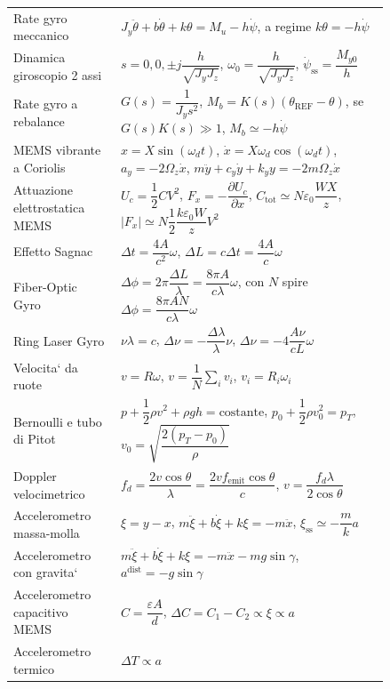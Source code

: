 \documentclass[11pt,a4paper]{article}
\begin{document}
{\begin{longtable}{>{\raggedright\arraybackslash}p{0.24\linewidth}>{\raggedright\arraybackslash}p{0.60\linewidth}}
Rate gyro meccanico & $J_y\ddot\theta+b\dot\theta+k\theta=M_u-h\dot\psi$, \quad a regime $k\theta=-h\dot\psi$ \\
Dinamica giroscopio 2 assi & $s=0,0,\pm j\dfrac{h}{\sqrt{J_yJ_z}}$, \quad $\omega_0=\dfrac{h}{\sqrt{J_yJ_z}}$, \quad $\dot\psi_{\text{ss}}=\dfrac{M_{y0}}{h}$ \\
Rate gyro a rebalance & $G(s)=\dfrac{1}{J_y s^2}$, \quad $M_b=K(s)(\theta_{\text{REF}}-\theta)$, \quad se $G(s)K(s)\gg 1$, $M_b\simeq -h\dot\psi$ \\
MEMS vibrante a Coriolis & $x=X\sin(\omega_d t)$, \quad $\dot x=X\omega_d\cos(\omega_d t)$, \quad $a_y=-2\Omega_z\dot x$, \quad $m\ddot y+c_y\dot y+k_y y=-2m\Omega_z\dot x$ \\
Attuazione elettrostatica MEMS & $U_c=\dfrac{1}{2}CV^2$, \quad $F_x=-\dfrac{\partial U_c}{\partial x}$, \quad $C_{\text{tot}}\simeq N\varepsilon_0\dfrac{WX}{z}$, \quad $|F_x|\simeq N\dfrac{1}{2}\dfrac{k\varepsilon_0W}{z}V^2$ \\
Effetto Sagnac & $\Delta t=\dfrac{4A}{c^2}\omega$, \quad $\Delta L=c\Delta t=\dfrac{4A}{c}\omega$ \\
Fiber-Optic Gyro & $\Delta\phi=2\pi\dfrac{\Delta L}{\lambda}=\dfrac{8\pi A}{c\lambda}\omega$, \quad con $N$ spire $\Delta\phi=\dfrac{8\pi A N}{c\lambda}\omega$ \\
Ring Laser Gyro & $\nu\lambda=c$, \quad $\Delta\nu=-\dfrac{\Delta\lambda}{\lambda}\nu$, \quad $\Delta\nu=-4\dfrac{A\nu}{cL}\omega$ \\
Velocita` da ruote & $v=R\omega$, \quad $v=\dfrac{1}{N}\sum_i v_i$, \quad $v_i=R_i\omega_i$ \\
Bernoulli e tubo di Pitot & $p+\dfrac{1}{2}\rho v^2+\rho gh=\text{costante}$, \quad $p_0+\dfrac{1}{2}\rho v_0^2=p_T$, \quad $v_0=\sqrt{\dfrac{2(p_T-p_0)}{\rho}}$ \\
Doppler velocimetrico & $f_d=\dfrac{2v\cos\theta}{\lambda}=\dfrac{2vf_{\text{emit}}\cos\theta}{c}$, \quad $v=\dfrac{f_d\lambda}{2\cos\theta}$ \\
Accelerometro massa-molla & $\xi=y-x$, \quad $m\ddot\xi+b\dot\xi+k\xi=-m\ddot x$, \quad $\xi_{\text{ss}}\simeq -\dfrac{m}{k}a$ \\
Accelerometro con gravita` & $m\ddot\xi+b\dot\xi+k\xi=-m\ddot x-mg\sin\gamma$, \quad $a^{\text{dist}}=-g\sin\gamma$ \\
Accelerometro capacitivo MEMS & $C=\dfrac{\varepsilon A}{d}$, \quad $\Delta C=C_1-C_2\propto \xi \propto a$ \\
Accelerometro termico & $\Delta T \propto a$ \\

\end{longtable}}
\end{document}
